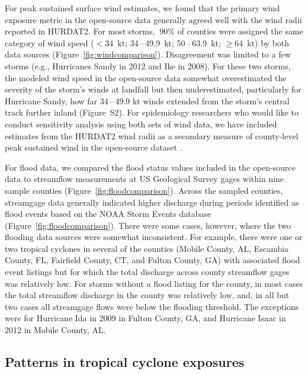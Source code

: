 For peak sustained surface wind estimates, we found that the primary wind
exposure metric in the open-source data generally agreed well with the wind
radii reported in \ac{HURDAT2}. For most storms, $\>$90\% of counties were
assigned the same category of wind speed ($<$34~kt; 34\,--\,49.9~kt;
50\,--\,63.9~kt; $\ge$64~kt) by both data sources
(Figure~\ref{fig:windcomparison}).  Disagreement was limited to a few storms
(e.g., Hurricanes Sandy in 2012 and Ike in 2008). For these two storms, the
modeled wind speed in the open-source data somewhat overestimated the severity
of the storm's winds at landfall but then underestimated, particularly for
Hurricane Sandy, how far 34\,--\,49.9 kt winds extended from the storm's
central track further inland (Figure~S2). For epidemiology researchers who
would like to conduct sensitivity analysis using both sets of wind data,
we have included estimates from the \ac{HURDAT2} wind radii as a secondary
measure of county-level peak sustained wind in the open-source dataset
\parencite{hurricaneexposuredata}.

For flood data, we compared the flood status values included in the open-source
data to streamflow measurements at \ac{US} Geological Survey gages within nine
sample counties (Figure~\ref{fig:floodcomparison}). Across the sampled
counties, streamgage data generally indicated higher discharge during periods
identified as flood events based on the NOAA Storm Events database
(Figure~\ref{fig:floodcomparison}). There were some cases, however, where the
two flooding data sources were somewhat inconsistent.  For example, there were
one or two tropical cyclones in several of the counties (Mobile County, AL,
Escambia County, FL, Fairfield County, CT, and Fulton County, GA) with
associated flood event listings but for which the total discharge across county
streamflow gages was relatively low. For storms without a flood listing for the
county, in most cases the total streamflow discharge in the county was
relatively low, and, in all but two cases all streamgage flows were
below the flooding threshold. The exceptions were for Hurricane Ida in 2009 in
Fulton County, GA, and Hurricane Isaac in 2012 in Mobile County, AL. 

\subsection*{Patterns in tropical cyclone exposures}

